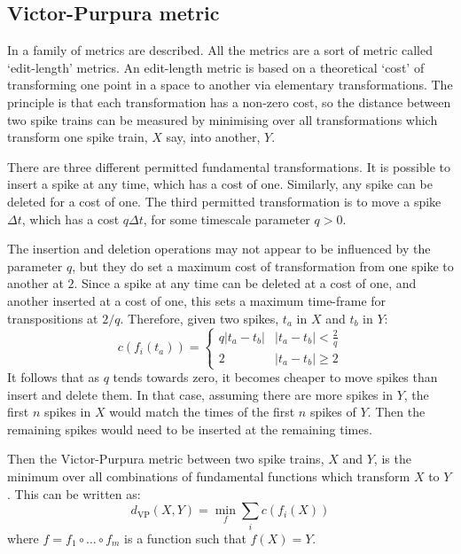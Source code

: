 \subsection{Victor-Purpura metric}

In \citep{VictorPurpura1997a} a family of metrics are described.  All the metrics are a sort of metric called \lq{}edit-length\rq{} metrics. An edit-length metric is based on a theoretical \lq{}cost\rq{} of transforming one point in a space to another via elementary transformations.  The principle is that each transformation has a non-zero cost, so the distance between two spike trains can be measured by minimising over all transformations which transform one spike train, $X$ say, into another, $Y$.

There are three different permitted fundamental transformations.  It is possible to insert a spike at any time, which has a cost of one.  Similarly, any spike can be deleted for a cost of one.  The third permitted transformation is to move a spike $\Delta t$, which has a cost $q\Delta t$, for some timescale parameter $q>0$.

The insertion and deletion operations may not appear to be influenced by the parameter $q$, but they do set a maximum cost of transformation from one spike to another at $2$.  Since a spike at any time can be deleted at a cost of one, and another inserted at a cost of one, this sets a maximum time-frame for transpositions at $2/q$.  Therefore, given two spikes, $t_a$ in $X$ and $t_b$ in $Y$:
\begin{equation}
c(f_i(t_a)) = \left\{ \begin{array}{ll} q | t_a - t_b | & | t_a - t_b | < \frac{2}{q} \\ 2 & | t_a - t_b | \geq 2 \end{array}\right.
\end{equation}
It follows that as $q$ tends towards zero, it becomes cheaper to move spikes than insert and delete them.  In that case, assuming there are more spikes in $Y$, the first $n$ spikes in $X$ would match the times of the first $n$ spikes of $Y$.  Then the remaining spikes would need to be inserted at the remaining times.

Then the Victor-Purpura metric between two spike trains, $X$ and $Y$, is the minimum over all combinations of fundamental functions which transform $X$ to $Y$.  This can be written as:
\begin{equation}
d_{\text{VP}}(X,Y) = \min_f \sum_i c\left( f_i(X) \right)
\end{equation}
where $f=f_1\circ\ldots\circ f_m$ is a function such that $f(X) = Y$.

